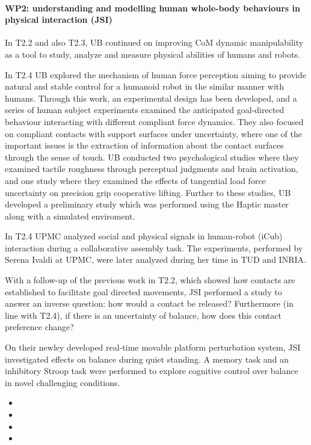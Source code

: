  
\paragraph*{WP2: understanding and modelling human whole-body behaviours in physical interaction (JSI)}

In T2.2 and also T2.3, UB continued on improving CoM dynamic manipulability as a tool to study, analyze and measure physical abilities of humans and robots.

In T2.4 UB explored the mechanism of human force perception aiming to provide natural and stable control for a humanoid robot in the similar manner with humans. Through this work, an experimental design has been developed, and a series of human subject experiments examined the anticipated goal-directed behaviour interacting with different compliant force dynamics. They also focused on compliant contacts with support surfaces under uncertainty, where one of the important issues is the extraction of information about the contact surfaces through the sense of touch. UB conducted two psychological studies where they examined tactile roughness through perceptual judgments and brain activation, and one study where they examined the effects of tangential load force uncertainty on precision grip cooperative lifting. Further to these studies, UB developed a preliminary study which was performed using the Haptic master along with a simulated enviroment. 

In T2.4 UPMC analyzed social and physical signals in human-robot (iCub) interaction during a collaborative assembly task. The experiments, performed by Serena Ivaldi at UPMC, were later analyzed during her time in TUD and INRIA.

With a follow-up of the previous work in T2.2, which showed how contacts are established to facilitate goal directed movements, JSI performed a study to answer an inverse question: how would a contact be released? Furthermore (in line with T2.4), if there is an uncertainty of balance, how does this contact preference change?

On their newley developed real-time movable platform perturbation system, JSI investigated effects on balance during quiet standing. A memory task and an inhibitory Stroop task were performed to explore cognitive control over balance in novel challenging conditions.

\begin{itemize}

\item 
\item 
\item 
\item 

 \end{itemize}

